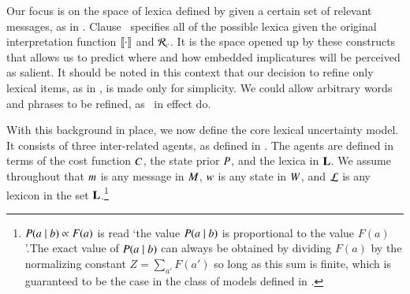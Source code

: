 \documentclass[leqno,12pt]{article}
\begin{document}
Our focus is on the space of lexica defined by
 given a certain set of relevant messages,
as in . Clause~
specifies all of the possible lexica given the original interpretation
function $\llbracket\cdot\rrbracket$ and $\mathcal{R}_{c}$. It is the space opened up by
these constructs that allows us to predict where and how embedded
implicatures will be perceived as salient. It should be noted in this
context that our decision to refine only lexical items, as in
, is made only for simplicity. We could
allow arbitrary words and phrases to be refined, as \CFS\ in effect
do.


With this background in place, we now define the core lexical
uncertainty model. It consists of three inter-related agents, as
defined in . The agents are defined in terms of the cost
function $C$, the state prior $P$, and the lexica in
$\mathbf{L}$. We assume throughout that $m$ is any message in
$M$, $w$ is any state in $W$, and $\mathcal{L}$ is any
lexicon in the set $\mathbf{L}$.\footnote{$P(a \mid b) \propto F(a)$ is
  read `the value $P(a \mid b)$ is proportional to the value
  $F(a)$'.The exact value of $P(a \mid b)$ can always be obtained by
  dividing $F(a)$ by the normalizing constant $Z=\sum_{a'} F(a')$ so
  long as this sum is finite, which is guaranteed to be the case in
  the class of models defined in .}
%
\end{document}
